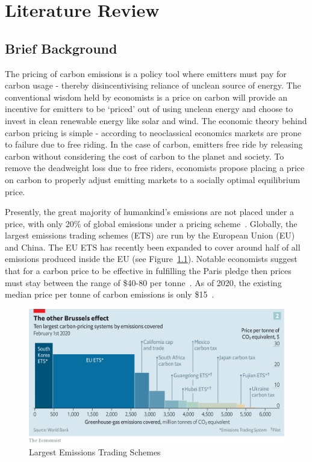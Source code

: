 \chapter{Literature Review}\label{ch:review}
\section{Brief Background}
The pricing of carbon emissions is a policy tool where emitters must pay
for carbon usage - thereby disincentivising reliance of unclean source of
energy. The conventional wisdom held by economists is a price on carbon
will provide an incentive for emitters to be `priced' out of using
unclean energy and choose to invest in clean renewable energy like
solar and wind. The economic theory behind carbon pricing is
simple - according to neoclassical economics markets are prone to
failure due to free riding. In the case of carbon, emitters free ride
by releasing carbon without considering the cost of carbon to the
planet and society. To remove the deadweight loss due to free riders, economists
propose placing a price on carbon to properly adjust emitting markets
to a socially optimal equilibrium price.

Presently, the great majority of humankind's emissions are not placed under
a price, with only 20\% of global emissions under a pricing
scheme~\cite{EconE}. Globally, the largest emissions trading schemes (ETS) are
run by the European Union (EU) and China. The EU ETS has recently been expanded
to cover around half of all emissions produced inside the EU (see
Figure~\ref{fig:ets}). Notable
economists suggest that for a carbon price to be effective in fulfilling the
Paris pledge then prices must stay between the range of \$40-80 per
tonne~\cite{EconE}.
As of 2020, the existing median price per tonne of carbon emissions is
only \$15~\cite{EconE}.

\begin{figure}[H]
    \centering
    \includegraphics[scale=0.2]{photos/ets.png}
    \caption{Largest Emissions Trading Schemes}
    \label{fig:ets}
\end{figure}

